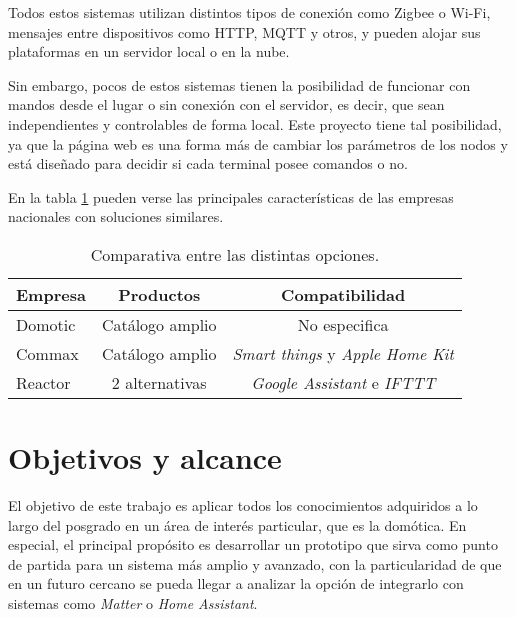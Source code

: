 Todos estos sistemas utilizan distintos tipos de conexión como Zigbee o Wi-Fi, mensajes entre dispositivos como HTTP, MQTT y otros, y pueden alojar sus plataformas en un servidor local o en la nube.

Sin embargo, pocos de estos sistemas tienen la posibilidad de funcionar con mandos desde el lugar o sin conexión con el servidor, es decir, que sean independientes y controlables de forma local. Este proyecto tiene tal posibilidad, ya que la página web es una forma más de cambiar los parámetros de los nodos y está diseñado para decidir si cada terminal posee comandos o no.

En la tabla \ref{tab:empresas} pueden verse las principales características de las empresas nacionales con soluciones similares.

\begin{table}[h]
\centering
\caption[Comparativa entre las distintas opciones del mercado nacional]{Comparativa entre las distintas opciones.}
\begin{tabular}{l c c}
\toprule
\textbf{Empresa} & \textbf{Productos} & \textbf{Compatibilidad}\\
\midrule
Domotic	& Catálogo amplio & No especifica \\
Commax	& Catálogo amplio & \textit{Smart things} y \textit{Apple Home Kit}	\\
Reactor	& 2 alternativas & \textit{Google Assistant} e \textit{IFTTT} \\
\bottomrule
\hline
\end{tabular}
\label{tab:empresas}
\end{table}

\section{Objetivos y alcance}

El objetivo de este trabajo es aplicar todos los conocimientos adquiridos a lo largo del posgrado en un área de interés particular, que es la domótica. En especial, el principal propósito es desarrollar un prototipo que sirva como punto de partida para un sistema más amplio y avanzado, con la particularidad de que en un futuro cercano se pueda llegar a analizar la opción de integrarlo con sistemas como \textit{Matter} o \textit{Home Assistant}.

